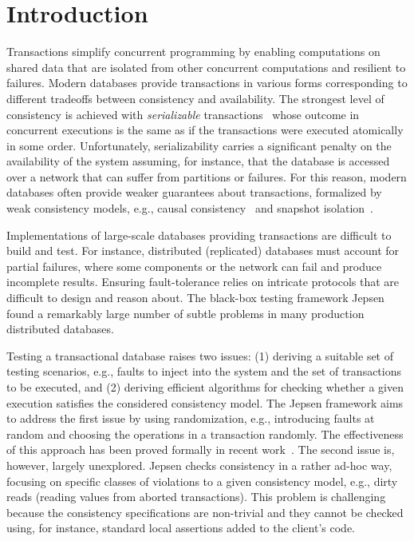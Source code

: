 
\section{Introduction}

Transactions simplify concurrent programming by enabling computations on shared data that are isolated from other concurrent computations and resilient to failures. Modern databases provide transactions in various forms corresponding to different tradeoffs between consistency and availability. The strongest level of consistency is achieved with \emph{serializable} transactions~\cite{DBLP:journals/jacm/Papadimitriou79b} whose outcome in concurrent executions is the same as if the transactions were executed atomically in some order. Unfortunately, serializability carries a significant penalty on the availability of the system assuming, for instance, that the database is accessed over a network that can suffer from partitions or failures. For this reason, modern databases often provide weaker guarantees about transactions, formalized by weak consistency models, e.g., causal consistency~\cite{DBLP:journals/cacm/Lamport78} and snapshot isolation~\cite{DBLP:conf/sigmod/BerensonBGMOO95}.

Implementations of large-scale databases providing transactions are difficult to build and test. For instance, distributed (replicated) databases must account for partial failures, where some components or the network can fail and produce incomplete results. Ensuring fault-tolerance relies on intricate protocols that are difficult to design and reason about. The black-box testing framework Jepsen~\cite{jepsen} found a remarkably large number of subtle problems in many production distributed databases. %

Testing a transactional database raises two issues: (1) deriving a suitable set of testing scenarios, e.g., faults to inject into the system and the set of transactions to be executed, and (2) deriving efficient algorithms for checking whether a given execution satisfies the considered consistency model. The Jepsen framework aims to address the first issue by using randomization, 
e.g., introducing faults at random and choosing the operations in a transaction randomly. The effectiveness of this approach has been proved formally in recent work~\cite{DBLP:journals/pacmpl/OzkanMNBW18}. The second issue is, however, largely unexplored. Jepsen checks consistency in a rather ad-hoc way, focusing on specific classes of violations to a given consistency model, e.g., dirty reads (reading values from aborted transactions). This problem is challenging because the consistency specifications are non-trivial and they cannot be checked using, for instance, standard local assertions added to the client's code. 

